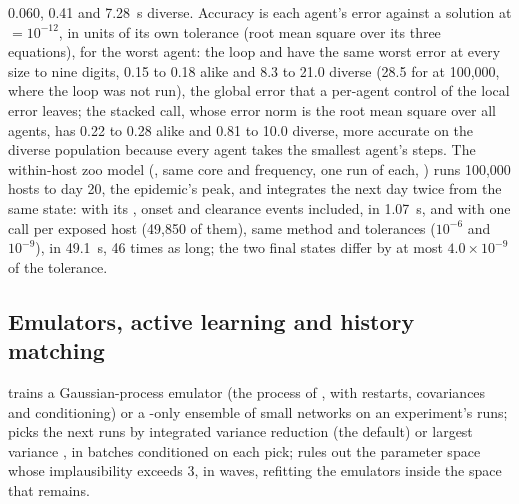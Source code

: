 0.060, 0.41 and 7.28~s diverse. Accuracy is each agent's error against a solution at
 $= 10^{-12}$, in units of its own tolerance  (root
mean square over its three equations), for the worst agent: the loop and 
have the same worst error at every size to nine digits, 0.15 to 0.18 alike and 8.3 to 21.0
diverse (28.5 for  at 100,000, where the loop was not run), the global
error that a per-agent control of the local error leaves; the stacked call, whose error norm
is the root mean square over all agents, has 0.22 to 0.28 alike and 0.81 to 10.0 diverse,
more accurate on the diverse population because every agent takes the smallest agent's
steps. The within-host zoo model (, same core and
frequency, one run of each, ) runs 100,000 hosts to
day 20, the epidemic's peak, and integrates the next day twice from the same state: with its
, onset and clearance events included, in 1.07~s, and with one
 call per exposed host (49,850 of them), same method and tolerances
($10^{-6}$ and $10^{-9}$), in 49.1~s, 46 times as long; the two final states differ by at
most $4.0 \times 10^{-9}$ of the tolerance.

\subsection{Emulators, active learning and history matching}
\label{app:emulate}

 trains a Gaussian-process emulator (the process of
, with restarts, covariances and conditioning) or a -only
ensemble of small networks on an experiment's runs;  picks the next runs
by integrated variance reduction (the default) or largest variance \citep{mackay1992information},
in batches conditioned on each pick;  \citep{vernon2010galaxy,
andrianakis2015bayesian} rules out the parameter space whose implausibility exceeds 3, in
waves, refitting the emulators inside the space that remains.

